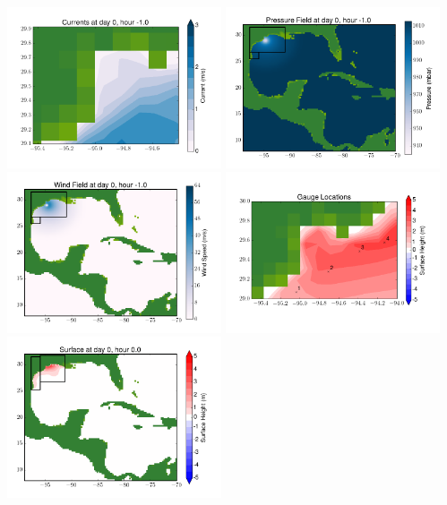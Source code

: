 \documentclass[11pt]{article}
\begin{document}
\vskip 10pt 
\includegraphics[width=0.475\textwidth]{frame0071fig7.png}
\includegraphics[width=0.475\textwidth]{frame0071fig8.png}
\vskip 10pt 
\includegraphics[width=0.475\textwidth]{frame0071fig9.png}
\includegraphics[width=0.475\textwidth]{frame0071fig10.png}
\vskip 10pt 
\includegraphics[width=0.475\textwidth]{frame0072fig1.png}
\end{document}
